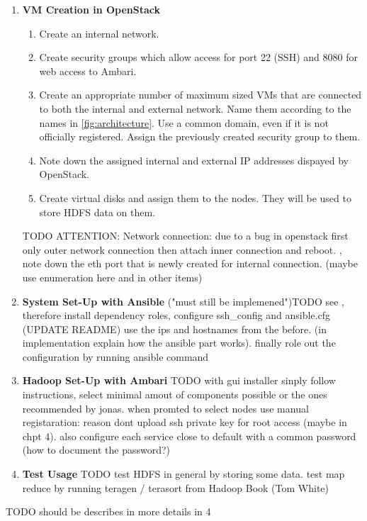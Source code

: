 \begin{enumerate}
    \item \textbf{\ac{VM} Creation in OpenStack}
    \begin{enumerate}
        \item Create an internal network.
        \item Create security groups which allow access for port 22 (\ac{SSH}) and 8080 for web access to Ambari.
        \item Create an appropriate number of maximum sized \acp{VM} that are connected to both the internal and external network. Name them according to the names in \ref{fig:architecture}. Use a common domain, even if it is not officially registered.
        Assign the previously created security group to them.
        \item Note down the assigned internal and external \ac{IP} addresses dispayed by OpenStack.
        \item Create virtual disks and assign them to the nodes. They will be used to store \ac{HDFS} data on them.
    \end{enumerate}
    TODO ATTENTION: Network connection: due to a bug in openstack first only outer network connection then attach inner connection and reboot. , note down the eth port that is newly created for internal connection. (maybe use enumeration here and in other items)
    
    \item \textbf{System Set-Up with Ansible} ("must still be implemened")TODO  see ,
    therefore install dependency roles, configure ssh\_config and ansible.cfg (UPDATE README) use the ips and hostnames from the before. (in implementation explain how the ansible part works). finally role out the configuration by running ansible command
    
    \item \textbf{Hadoop Set-Up with Ambari} TODO with gui installer sinply follow instructions, select minimal amout of components possible or the ones recommended by jonas. when promted to select nodes use manual registaration: reason dont upload ssh private key for root access (maybe in chpt 4). also configure each service close to default with a common password (how to document the password?)
    
    \item \textbf{Test Usage} TODO test HDFS in general by storing some data. test map reduce by running teragen / terasort from Hadoop Book (Tom White)
\end{enumerate}

TODO should be describes in more details in 4
